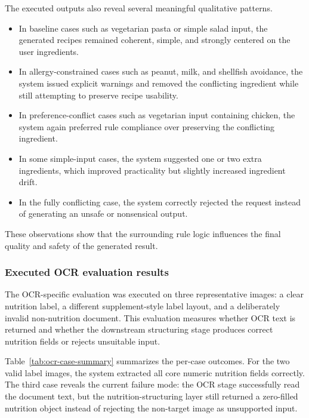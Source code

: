 The executed outputs also reveal several meaningful qualitative
patterns.

\begin{itemize}
	\item In baseline cases such as vegetarian pasta or simple salad input,
	the generated recipes remained coherent, simple, and strongly centered
	on the user ingredients.
	\item In allergy-constrained cases such as peanut, milk, and shellfish
	avoidance, the system issued explicit warnings and removed the
	conflicting ingredient while still attempting to preserve recipe
	usability.
	\item In preference-conflict cases such as vegetarian input containing
	chicken, the system again preferred rule compliance over preserving the
	conflicting ingredient.
	\item In some simple-input cases, the system suggested one or two extra
	ingredients, which improved practicality but slightly increased
	ingredient drift.
	\item In the fully conflicting case, the system correctly rejected the
	request instead of generating an unsafe or nonsensical output.
\end{itemize}

These observations show that the surrounding rule logic influences the
final quality and safety of the generated result.

\subsubsection{Executed OCR evaluation results}

The OCR-specific evaluation was executed on three representative images:
a clear nutrition label, a different supplement-style label layout, and
a deliberately invalid non-nutrition document. This evaluation measures
whether OCR text is returned and whether the downstream structuring
stage produces correct nutrition fields or rejects unsuitable input.

Table~\ref{tab:ocr-case-summary} summarizes the per-case outcomes. For
the two valid label images, the system extracted all core numeric
nutrition fields correctly. The third case reveals the current failure
mode: the OCR stage successfully read the document text, but the
nutrition-structuring layer still returned a zero-filled nutrition
object instead of rejecting the non-target image as unsupported input.

